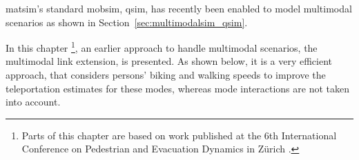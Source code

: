 \gls{matsim}'s standard \gls{mobsim}, \gls{qsim}, has recently been enabled to model \gls{multimodal} scenarios as shown in Section~\ref{sec:multimodalsim_qsim}.

In this chapter \footnote{Parts of this chapter are based on work published at the 6th International Conference on Pedestrian and Evacuation Dynamics in Zürich \cite{00DoblerLaemmelAxhausen2012PedMultiModal}.},
 an earlier approach to handle \gls{multimodal} scenarios, the \gls{multimodal} link \gls{extension}, is presented. As shown below, it is a very efficient approach, that considers persons' biking and walking speeds to improve the \gls{teleportation} estimates for these modes, whereas mode interactions are not taken into account. 


